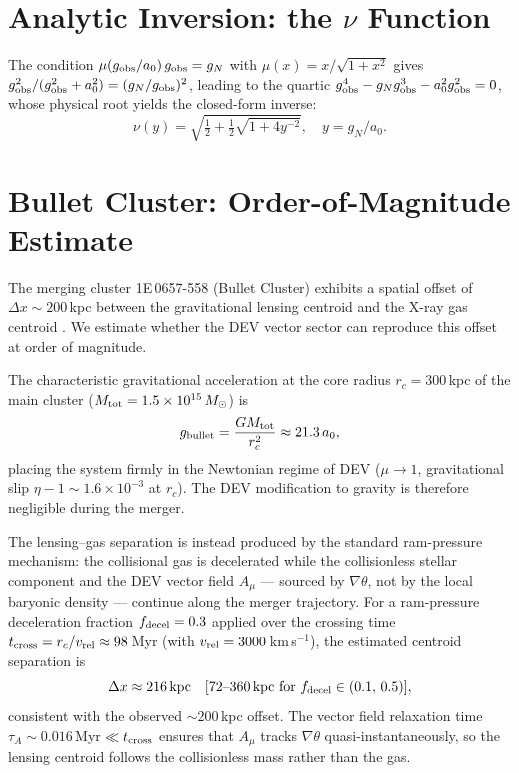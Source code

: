 \documentclass[aps,prd,twocolumn,showpacs,superscriptaddress]{revtex4-2}
\newcommand{\aO}{a_0}
\begin{document}
\section{Analytic Inversion: the $\nu$ Function}
\label{app:nu}

The condition $\mu(g_{\rm obs}/\aO)\,g_{\rm obs} = g_N$
with $\mu(x) = x/\sqrt{1+x^2}$ gives
$g_{\rm obs}^2/(g_{\rm obs}^2 + \aO^2) = (g_N/g_{\rm obs})^2$,
leading to the quartic $g_{\rm obs}^4 - g_N g_{\rm obs}^3 - \aO^2 g_{\rm obs}^2 = 0$,
whose physical root yields the closed-form inverse:
\begin{equation}
  \nu(y) = \sqrt{\tfrac{1}{2} + \tfrac{1}{2}\sqrt{1+4y^{-2}}},
  \quad y = g_N/\aO.
\end{equation}

\section{Bullet Cluster: Order-of-Magnitude Estimate}
\label{app:bullet}

The merging cluster 1E\,0657-558 (Bullet Cluster) exhibits
a spatial offset of $\Delta x \sim 200$\,kpc between the
gravitational lensing centroid and the X-ray gas centroid
\cite{Clowe2006}. We estimate whether the DEV vector sector
can reproduce this offset at order of magnitude.

The characteristic gravitational acceleration at the core
radius $r_c = 300$\,kpc of the main cluster
($M_{\rm tot} = 1.5\times10^{15}\,M_\odot$) is
\begin{equation}
  g_{\rm bullet} = \frac{GM_{\rm tot}}{r_c^2}
  \approx 21.3\,\aO,
\end{equation}
placing the system firmly in the Newtonian regime of DEV
($\mu \to 1$, gravitational slip $\eta - 1 \sim 1.6\times10^{-3}$
at $r_c$). The DEV modification to gravity is therefore
negligible during the merger.

The lensing--gas separation is instead produced by the
standard ram-pressure mechanism: the collisional gas is
decelerated while the collisionless stellar component and
the DEV vector field $A_\mu$ --- sourced by $\nabla\theta$,
not by the local baryonic density --- continue along the
merger trajectory. For a ram-pressure deceleration fraction
$f_{\rm decel} = 0.3$ applied over the crossing time
$t_{\rm cross} = r_c/v_{\rm rel} \approx 98$\,Myr
(with $v_{\rm rel} = 3000$\,km\,s$^{-1}$), the estimated
centroid separation is
\begin{equation}
  \Delta x \approx 216\,\mathrm{kpc}
  \quad [72\text{--}360\,\mathrm{kpc\ for\ }
  f_{\rm decel}\in(0.1,\,0.5)],
\end{equation}
consistent with the observed ${\sim}200$\,kpc offset.
The vector field relaxation time $\tau_A \sim 0.016$\,Myr
$\ll t_{\rm cross}$ ensures that $A_\mu$ tracks
$\nabla\theta$ quasi-instantaneously, so the lensing
centroid follows the collisionless mass rather than the gas.
\end{document}
